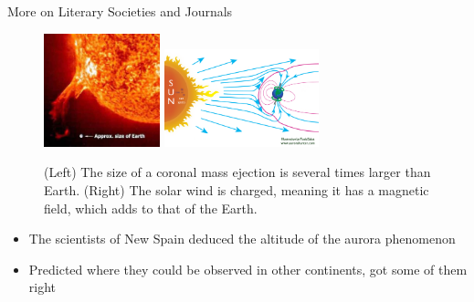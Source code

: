 \documentclass{beamer}
\begin{document}
\begin{frame}{More on Literary Societies and Journals}
\small
\begin{figure}
\includegraphics[width=0.3\textwidth]{figures/earth-flare.jpg}
\includegraphics[width=0.4\textwidth]{figures/how-the-auroras-form.png}
\caption{(Left) The size of a coronal mass ejection is several times larger than Earth. (Right) The solar wind is charged, meaning it has a magnetic field, which adds to that of the Earth.}
\end{figure}
\begin{itemize}
\item The scientists of New Spain deduced the altitude of the aurora phenomenon
\item Predicted where they could be observed in other continents, got some of them right
\end{itemize}
\end{frame}
\end{document}
